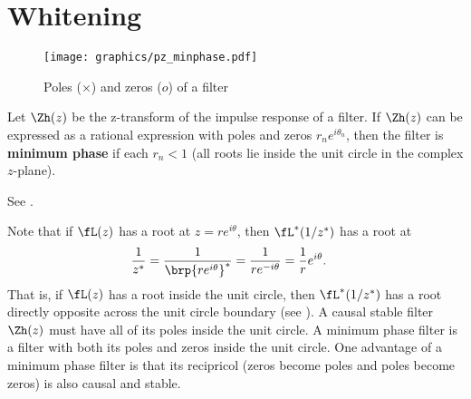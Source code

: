 \section{Whitening}
\label{sec:d-whiten}
\begin{figure}[h]
  \centering
  \texttt{[image: graphics/pz\_minphase.pdf]}
  \caption{
     Poles ($\times$) and zeros ($o$) of a  filter
     \label{fig:w_pz_minphase}
     }
\end{figure}
\begin{definition}
Let $\Zh(z)$ be the z-transform of the impulse response of a filter.
If $\Zh(z)$ can be expressed as a rational expression with poles and zeros
$r_ne^{i\theta_n}$,
then the filter is \textbf{minimum phase} if each $r_n<1$
(all roots lie inside the unit circle in the complex $z$-plane).
\end{definition}
See .

Note that if $\fL(z)$ has a root at $z=re^{i\theta}$, then
$\fL^\ast(1/z^\ast)$ has a root at
\begin{align*}
   \frac{1}{z^\ast}
     &= \frac{1}{\brp{re^{i\theta}}^\ast}
      = \frac{1}{re^{-i\theta}}
      = \frac{1}{r} e^{i\theta}.
\end{align*}
That is, if $\fL(z)$ has a root inside the unit circle,
then $\fL^\ast(1/z^\ast)$ has a root directly opposite across the unit circle
boundary (see ).
A causal stable filter $\Zh(z)$ must have all of its poles inside
the unit circle.
A minimum phase filter is a filter with both its poles and zeros inside the
unit circle.
One advantage of a minimum phase filter is that its recipricol
(zeros become poles and poles become zeros)
is also causal and stable.

